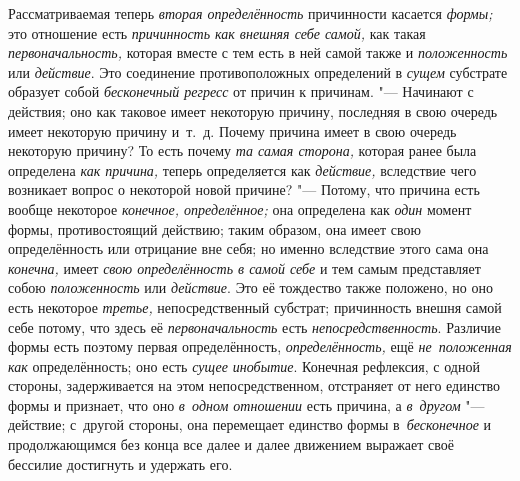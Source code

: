 Рассматриваемая теперь {\em вторая определённость} причинности касается
{\em формы;} это отношение есть {\em причинность как внешняя себе самой,} как
такая {\em первоначальность,} которая вместе с тем есть в ней самой также и
{\em положенность} или {\em действие}. Это соединение противоположных
определений в {\em сущем} субстрате образует собой {\em бесконечный регресс} от
причин к причинам. "--- Начинают с действия; оно как таковое имеет некоторую
причину, последняя в свою очередь имеет некоторую причину и~т.~д. Почему
причина имеет в свою очередь некоторую причину? То есть почему
{\em та самая сторона,} которая ранее была определена {\em как причина,} теперь
определяется как {\em действие,} вследствие чего возникает вопрос о некоторой
новой причине? "--- Потому, что причина есть вообще некоторое
{\em конечное, определённое;} она определена как {\em один} момент формы,
противостоящий действию; таким образом, она имеет свою определённость или
отрицание вне себя; но именно вследствие этого сама она {\em конечна,} имеет
{\em свою определённость в самой себе} и тем самым представляет собою
{\em положенность} или {\em действие}. Это её тождество также положено, но оно
есть некоторое {\em третье,} непосредственный субстрат; причинность внешня
самой себе потому, что здесь её {\em первоначальность} есть
{\em непосредственность}. Различие формы есть поэтому первая определённость,
{\em определённость,} ещё {\em не~положенная как} определённость; оно есть
{\em сущее инобытие}. Конечная рефлексия, с одной стороны, задерживается на
этом непосредственном, отстраняет от него единство формы и признает, что оно
{\em в~одном отношении} есть причина, а {\em в~другом} "--- действие;
с~другой стороны, она перемещает единство формы в~{\em бесконечное}
и продолжающимся без конца все далее и далее движением
выражает своё бессилие достигнуть и удержать его.

